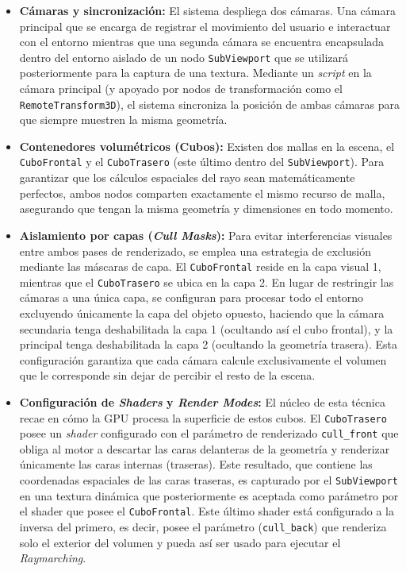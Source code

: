             \begin{itemize}
                \item \textbf{Cámaras y sincronización:} El sistema despliega dos cámaras. Una cámara principal que se encarga de registrar el movimiento del usuario e interactuar con el entorno mientras que una segunda cámara se encuentra encapsulada dentro del entorno aislado de un nodo \texttt{SubViewport} que se utilizará posteriormente para la captura de una textura. Mediante un \textit{script} en la cámara principal (y apoyado por nodos de transformación como el \texttt{RemoteTransform3D}), el sistema sincroniza la posición de ambas cámaras para que siempre muestren la misma geometría.
                
                \item \textbf{Contenedores volumétricos (Cubos):} Existen dos mallas en la escena, el \texttt{CuboFrontal} y el \texttt{CuboTrasero} (este último dentro del \texttt{SubViewport}). Para garantizar que los cálculos espaciales del rayo sean matemáticamente perfectos, ambos nodos comparten exactamente el mismo recurso de malla, asegurando que tengan la misma geometría y dimensiones en todo momento.
                
                \item \textbf{Aislamiento por capas (\textit{Cull Masks}):} Para evitar interferencias visuales entre ambos pases de renderizado, se emplea una estrategia de exclusión mediante las máscaras de capa. El \texttt{CuboFrontal} reside en la capa visual 1, mientras que el \texttt{CuboTrasero} se ubica en la capa 2. En lugar de restringir las cámaras a una única capa, se configuran para procesar todo el entorno excluyendo únicamente la capa del objeto opuesto, haciendo que la cámara secundaria tenga deshabilitada la capa 1 (ocultando así el cubo frontal), y la principal tenga deshabilitada la capa 2 (ocultando la geometría trasera). Esta configuración garantiza que cada cámara calcule exclusivamente el volumen que le corresponde sin dejar de percibir el resto de la escena.
                
                \item \textbf{Configuración de \textit{Shaders} y \textit{Render Modes}:} El núcleo de esta técnica recae en cómo la GPU procesa la superficie de estos cubos. El \texttt{CuboTrasero} posee un \textit{shader} configurado con el parámetro de renderizado \texttt{cull\_front} que obliga al motor a descartar las caras delanteras de la geometría y renderizar únicamente las caras internas (traseras). Este resultado, que contiene las coordenadas espaciales de las caras traseras, es capturado por el \texttt{SubViewport} en una textura dinámica que posteriormente es aceptada como parámetro por el shader que posee el \texttt{CuboFrontal}. Este último shader está configurado a la inversa del primero, es decir, posee el parámetro (\texttt{cull\_back}) que renderiza solo el exterior del volumen y pueda así ser usado para ejecutar el \textit{Raymarching}\cite{compute_shaders_pointclouds}.
            \end{itemize}
            
